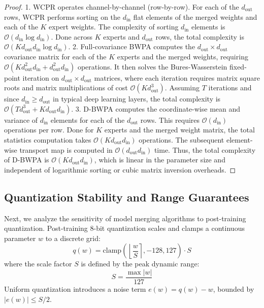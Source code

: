 \documentclass{article}
\theoremstyle{plain}
\theoremstyle{definition}
\theoremstyle{remark}
\begin{document}
\begin{proof}
1. WCPR operates channel-by-channel (row-by-row). For each of the $d_{\text{out}}$ rows, WCPR performs sorting on the $d_{\text{in}}$ flat elements of the merged weights and each of the $K$ expert weights. The complexity of sorting $d_{\text{in}}$ elements is $\mathcal{O}(d_{\text{in}} \log d_{\text{in}})$. Done across $K$ experts and $d_{\text{out}}$ rows, the total complexity is $\mathcal{O}(K d_{\text{out}} d_{\text{in}} \log d_{\text{in}})$.
2. Full-covariance BWPA computes the $d_{\text{out}} \times d_{\text{out}}$ covariance matrix for each of the $K$ experts and the merged weights, requiring $\mathcal{O}(K d_{\text{out}}^2 d_{\text{in}} + d_{\text{out}}^2 d_{\text{in}})$ operations. It then solves the Bures-Wasserstein fixed-point iteration on $d_{\text{out}} \times d_{\text{out}}$ matrices, where each iteration requires matrix square roots and matrix multiplications of cost $\mathcal{O}(K d_{\text{out}}^3)$. Assuming $T$ iterations and since $d_{\text{in}} \ge d_{\text{out}}$ in typical deep learning layers, the total complexity is $\mathcal{O}(T d_{\text{out}}^3 + K d_{\text{out}} d_{\text{in}})$.
3. D-BWPA computes the coordinate-wise mean and variance of $d_{\text{in}}$ elements for each of the $d_{\text{out}}$ rows. This requires $\mathcal{O}(d_{\text{in}})$ operations per row. Done for $K$ experts and the merged weight matrix, the total statistics computation takes $\mathcal{O}(K d_{\text{out}} d_{\text{in}})$ operations. The subsequent element-wise transport map is computed in $\mathcal{O}(d_{\text{out}} d_{\text{in}})$ time. Thus, the total complexity of D-BWPA is $\mathcal{O}(K d_{\text{out}} d_{\text{in}})$, which is linear in the parameter size and independent of logarithmic sorting or cubic matrix inversion overheads.
\end{proof}

\subsection{Quantization Stability and Range Guarantees}
Next, we analyze the sensitivity of model merging algorithms to post-training quantization. Post-training 8-bit quantization scales and clamps a continuous parameter $w$ to a discrete grid:
\begin{equation}
  q(w) = \mathrm{clamp}\left( \left\lfloor \frac{w}{S} \right\rceil, -128, 127 \right) \cdot S
\end{equation}
where the scale factor $S$ is defined by the peak dynamic range:
\begin{equation}
  S = \frac{\max |w|}{127}
\end{equation}
Uniform quantization introduces a noise term $e(w) = q(w) - w$, bounded by $|e(w)| \le S/2$.
\end{document}
